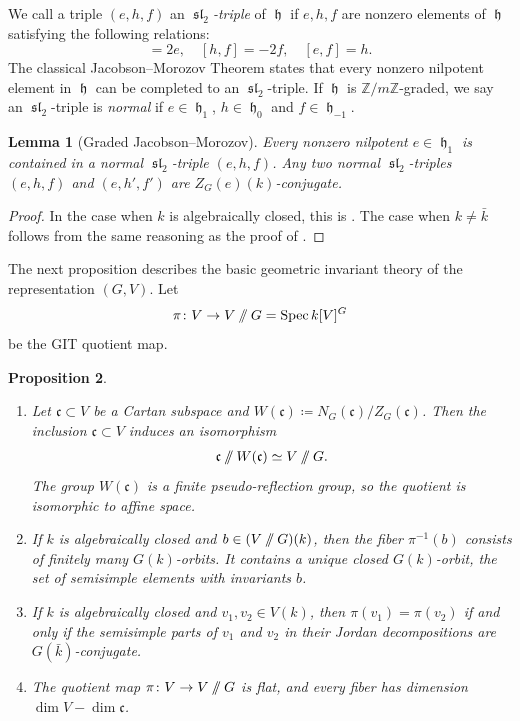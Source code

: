 \documentclass{article} %
\newtheorem{proposition}{Proposition}[section]
\newtheorem{lemma}[proposition]{Lemma}
\numberwithin{equation}{section}
\theoremstyle{definition}
\DeclareMathOperator{\liesl}{\mathfrak{sl}}
\DeclareMathOperator{\lieh}{\mathfrak{h}}
\DeclareMathOperator{\Spec}{Spec}
\newcommand{\GIT}{\mathbin{/\mkern-6mu/}}
\newcommand{\Z}{\mathbb{Z}}
\begin{document}
We call a triple $(e,h,f)$ an \emph{$\liesl_2$-triple} of $\lieh$ if $e,h,f$ are nonzero elements of $\lieh$ satisfying the following relations:
\begin{equation*}
[h,e] = 2e , \quad [h,f] = -2f ,\quad [e,f] = h .
\end{equation*}
The classical Jacobson--Morozov Theorem states that every nonzero nilpotent element in $\lieh$ can be completed to an $\liesl_2$-triple. 
If $\lieh$ is $\Z/m\Z$-graded, we say an $\liesl_2$-triple is \emph{normal} if $e \in \lieh_1$, $h \in \lieh_0$ and $f\in \lieh_{-1}$.



\begin{lemma}[Graded Jacobson--Morozov]\label{lemma: graded Jacobson-Morozov}
Every nonzero nilpotent $e\in \lieh_{1}$ is contained in a normal $\liesl_2$-triple $(e,h,f)$.
Any two normal $\liesl_2$-triples $(e,h,f)$ and $(e,h',f')$ are $Z_G(e)(k)$-conjugate.
\end{lemma}
\begin{proof}
    In the case when $k$ is algebraically closed, this is \cite[Theorem 1]{Vinberg-nilpotent}. The case when $k\neq \bar{k}$ follows from the same reasoning as the proof of \cite[Lemma 2.17]{Thorne-thesis}.
\end{proof}





The next proposition describes the basic geometric invariant theory of the representation $(G,V)$.
Let 
\begin{align}\label{equation: GIT quotient map}
\pi\colon V\rightarrow V \GIT G = \Spec k[V]^G    
\end{align} 
be the GIT quotient map.
\begin{proposition}\label{proposition: basic invariant theory of vinberg representation full generality}
\begin{enumerate}
\item Let $\mathfrak{c} \subset V$ be a Cartan subspace and $W(\mathfrak{c})  \coloneqq N_G(\mathfrak{c})/Z_G(\mathfrak{c})$. Then the inclusion $\mathfrak{c} \subset V$ induces an isomorphism 
\begin{align*}
\mathfrak{c} \GIT W(\mathfrak{c}) \simeq V\GIT G. 
\end{align*}
The group $W(\mathfrak{c})$ is a finite pseudo-reflection group, so the quotient is isomorphic to affine space.

\item If $k$ is algebraically closed and $b\in (V \GIT G)(k)$, then the fiber $\pi^{-1}(b)$ consists of finitely many $G(k)$-orbits.
It contains a unique closed $G(k)$-orbit, the set of semisimple elements with invariants $b$.
\item If $k$ is algebraically closed and $v_1,v_2\in V(k)$, then $\pi(v_1) = \pi(v_2)$ if and only if the semisimple parts of $v_1$ and $v_2$ in their Jordan decompositions are $G(\bar{k})$-conjugate.

\item The quotient map $\pi\colon V\rightarrow V\GIT G$ is flat, and every fiber has dimension $\dim V - \dim \mathfrak{c}$.
\end{enumerate}
\end{proposition}
\end{document}
